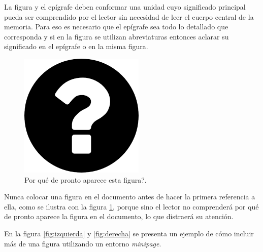 

La figura y el epígrafe deben conformar una unidad cuyo significado principal pueda ser comprendido por el lector sin necesidad de leer el cuerpo central de la memoria. Para eso es necesario que el epígrafe sea todo lo detallado que corresponda y si en la figura se utilizan abreviaturas entonces aclarar su significado en el epígrafe o en la misma figura.

\begin{figure}[ht]
	\centering
	\includegraphics[scale=.37]{./Figures/questionMark.png}
	\caption{Por qué de pronto aparece esta figura?.}
	\label{fig:questionMark}
\end{figure}

Nunca colocar una figura en el documento antes de hacer la primera referencia a ella, como se ilustra con la figura \ref{fig:questionMark}, porque sino el lector no comprenderá por qué de pronto aparece la figura en el documento, lo que distraerá su atención.

En la figura \ref{fig:izquierda} y \ref{fig:derecha} se presenta un ejemplo de cómo incluir más de una figura utilizando un entorno \textit{minipage}.

